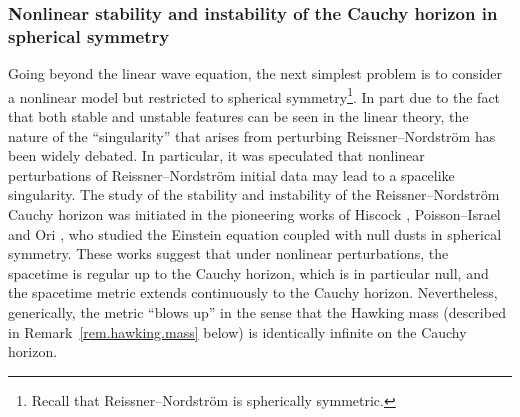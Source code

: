 \documentclass[10pt, reqno]{amsart}
\theoremstyle{definition}
\theoremstyle{remark}
\numberwithin{equation}{section}
\newcommand{\0}{\emptyset}
\begin{document}
\subsubsection{Nonlinear stability and instability of the Cauchy horizon in spherical symmetry} \label{sec.prev-works-nonlinear}

Going beyond the linear wave equation, the next simplest problem is to consider a nonlinear model but restricted to spherical symmetry\footnote{Recall that Reissner--Nordstr\"om is spherically symmetric.}. In part due to the fact that both stable and unstable features can be seen in the linear theory, the nature of the ``singularity'' that arises from perturbing Reissner--Nordstr\"om has been widely debated. In particular, it was speculated that nonlinear perturbations of Reissner--Nordstr\"om initial data may lead to a spacelike singularity. The study of the stability and instability of the Reissner--Nordstr\"om Cauchy horizon was initiated in the pioneering works of Hiscock \cite{Hiscock}, Poisson--Israel \cite{PI1, PI2} and Ori \cite{Ori}, who studied the Einstein equation coupled with null dusts in spherical symmetry. These works suggest that under nonlinear perturbations, the spacetime is regular up to the Cauchy horizon, which is in particular null, and the spacetime metric extends continuously to the Cauchy horizon. Nevertheless, generically, the metric ``blows up'' in the sense that the Hawking mass (described in Remark~\ref{rem.hawking.mass} below) is identically infinite on the Cauchy horizon.
\end{document}
